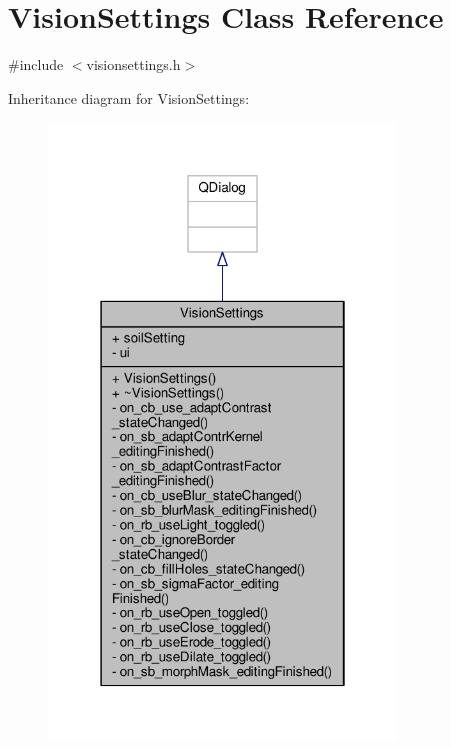 \hypertarget{class_vision_settings}{}\section{Vision\+Settings Class Reference}
\label{class_vision_settings}


{\ttfamily \#include $<$visionsettings.\+h$>$}



Inheritance diagram for Vision\+Settings\+:\nopagebreak
\begin{figure}[H]
\begin{center}
\leavevmode
\includegraphics[width=262pt]{class_vision_settings__inherit__graph}
\end{center}
\end{figure}


